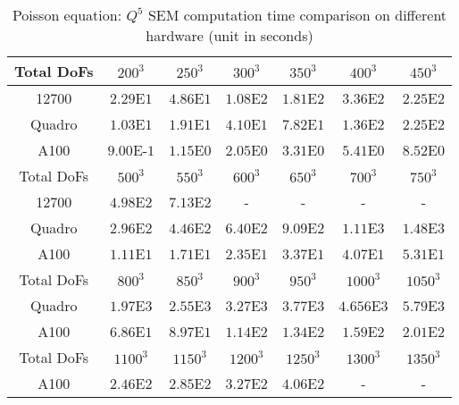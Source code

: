 \begin{table}[ht!]
    \centering
    \begin{tabular}{|c|c|c|c|c|c|c|}
    \hline
         Total DoFs & $200^3$ & $250^3$ & $300^3$ & $350^3$ & $400^3$ & $450^3$\\
    \hline
         12700 & $2.29$E$1$ & $4.86$E$1$ & $1.08$E$2$ & $1.81$E$2$ & $3.36$E$2$ &
         $2.25$E$2$\\
    \hline
         Quadro & $1.03$E$1$ & $1.91$E$1$ & $4.10$E$1$ & $7.82$E$1$ & $1.36$E$2$ &
         $2.25$E$2$\\

    \hline
         A100 & $9.00$E-$1$ & $1.15$E$0$ & $2.05$E$0$ & $3.31$E$0$ & $5.41$E$0$ &
         $8.52$E$0$\\
    \hline
    \hline
         Total DoFs & $500^3$ & $550^3$ & $600^3$ & $650^3$ & $700^3$ & $750^3$\\
    \hline
         12700 & $4.98$E$2$ & $7.13$E$2$ & - & - & - & - \\
    \hline
         Quadro & $2.96$E$2$ & $4.46$E$2$ & $6.40$E$2$ & $9.09$E$2$ & $1.11$E$3$ &
         $1.48$E$3$\\
    \hline
         A100 & $1.11$E$1$ & $1.71$E$1$ & $2.35$E$1$ & $3.37$E$1$ & $4.07$E$1$ &
         $5.31$E$1$\\
    \hline
    \hline
         Total DoFs & $800^3$ & $850^3$ & $900^3$ & $950^3$ & $1000^3$ & $1050^3$\\
    \hline
         Quadro & $1.97$E$3$ & $2.55$E$3$ & $3.27$E$3$ & $3.77$E$3$ & $4.656$E$3$ & $5.79$E$3$\\
    \hline
         A100  & $6.86$E$1$ & $8.97$E$1$ & $1.14$E$2$ & $1.34$E$2$ & $1.59$E$2$ &
         $2.01$E$2$\\
    \hline
    \hline
         Total DoFs & $1100^3$ & $1150^3$ & $1200^3$ & $1250^3$ & $1300^3$ & $1350^3$\\
    \hline
         A100 & $2.46$E$2$ & $2.85$E$2$ & $3.27$E$2$ & $4.06$E$2$ & - & -\\
    \hline
    \end{tabular}
    \caption{Poisson equation: $Q^5$ SEM computation time comparison on different hardware (unit in seconds)}
    \label{tab3: poisson_CPU_GPU}
\end{table}

